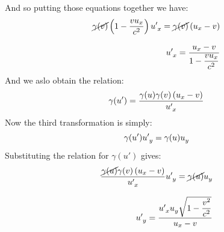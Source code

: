 And so putting those equations together we have:
\begin{equation}
  \begin{split}
    \cancel{\gamma(v)}\brackets{1-\dfrac{v u_x}{c^2}}\tensor{u}{^\prime_x} = \cancel{\gamma(v)}\brackets{u_x - v} \\[8pt]
    \tensor{u}{^\prime_x} = \dfrac{u_x - v}{1-\dfrac{v u_x}{c^2}}
  \end{split}
\end{equation}
And we aslo obtain the relation:
\begin{equation}
  \gamma(u') = \dfrac{\gamma(u)\gamma(v)\brackets{u_x-v}}{\tensor{u}{^\prime_x}}
\end{equation}
Now the third transformation is simply:
\begin{equation}
  \gamma(u')\tensor{u}{^\prime_y} = \gamma(u)\tensor{u}{_y}
\end{equation}
Substituting the relation for $\gamma(u')$ gives:
\begin{equation}
  \begin{split}
    \dfrac{\cancel{\gamma(u)}\gamma(v)\brackets{u_x-v}}{\tensor{u}{^\prime_x}}\tensor{u}{^\prime_y} = \cancel{\gamma(u)}\tensor{u}{_y} \\[8pt]
    \tensor{u}{^\prime_y} = \dfrac{\tensor{u}{^\prime_x} \tensor{u}{_y}\sqrt{1-\dfrac{v^2}{c^2}}}{u_x-v}
  \end{split}
\end{equation}

